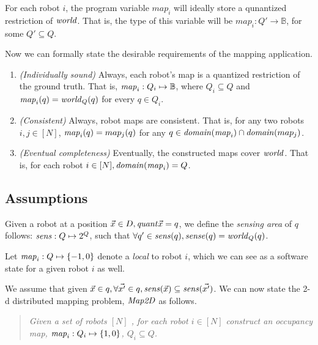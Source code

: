 For each robot $i$, the program variable $\mathit{map}_i$ will ideally store a qunantized restriction of $\mathit{world}$. That is, the type of this variable will be $\mathit{map}_i: Q' \rightarrow \mathbb{B}$, for some $Q' \subseteq Q$. 

Now we can formally state the desirable requirements of the mapping application.
\begin{enumerate}
	\item {\em (Individually sound)} Always, each robot's map is a quantized restriction of the ground truth. That is, $\mathit{map}_i: Q_i \mapsto \mathbb{B}$, where $Q_i\subseteq Q$ and  $\mathit{map}_i(q) = \mathit{world}_Q(q)$ for every $q\in Q_i$.
	\item {\em (Consistent)\/} Always, robot maps are consistent. That is, for any two robots $i,j \in [N]$,   $\mathit{map}_i(q) = map_j(q)$  for any  $q\in \mathit{domain}(\mathit{map}_i)  \cap \mathit{domain}(map_j)$.
	\item {\em (Eventual completeness)} Eventually, the constructed maps cover $\mathit{world}$. That is, for each robot $i\in [N], \mathit{domain}(\mathit{map}_i) = Q$.
\end{enumerate}


\subsection{Assumptions}
\label{sec:formal:sensing}

\begin{definition}
   Given a robot at a position $\Vec{x}\in D, \mathit{quant}{\Vec{x}} = q$, we define the \emph{sensing area} of $q$ follows: $\mathit{sens}: Q \mapsto 2^{Q}$, such that  $\forall q^\prime \in \mathit{sens}(q), \mathit{sense}(q) = \mathit{world}_Q(q)$.  
\end{definition}




Let $\mathit{map}_i:Q\mapsto \left\{-1,0\right\}$ denote a \qdfunc \emph{local} to robot $i$, which we can see as a software state for a given robot $i$ as well.  %



We assume that given $\Vec{x} \in q, \forall \Vec{x^\prime} \in q, \mathit{sens}(\Vec{x}) \subseteq \mathit{sens}(\Vec{x^\prime})$. We can now state the 2-d distributed mapping problem, $\mathit{Map2D}$ as follows. \begin{quote}
{\em Given a set of robots $[N]$ , for each robot $i \in [N]$ construct an \emph{occupancy map}, $\mathit{map}_i: Q_i \mapsto \left\{1,0\right\}$, $Q_i\subseteq Q$.
}
\end{quote}

